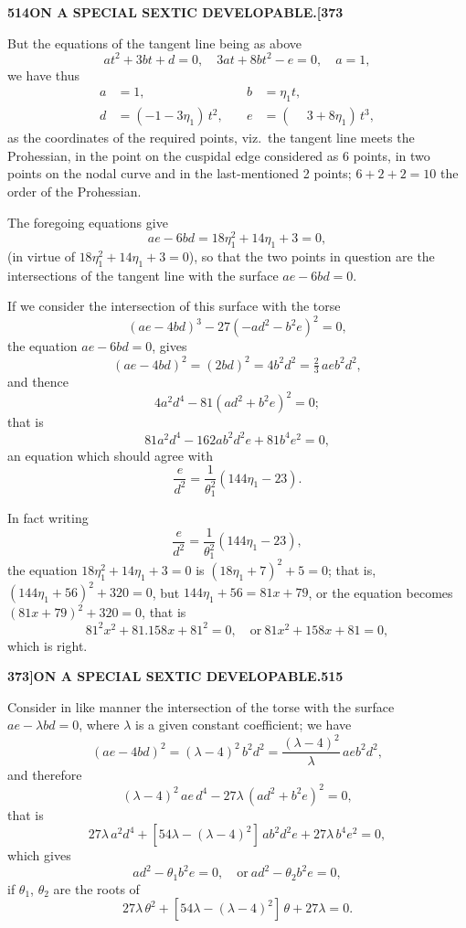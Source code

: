 \documentclass[11pt,a4paper]{article}
\begin{document}
\newpage
\noindent\textbf{514\hspace{1em}ON A SPECIAL SEXTIC DEVELOPABLE.\hfill[373}

\vspace{12pt}

\noindent
But the equations of the tangent line being as above
\[
at^{2} + 3bt + d = 0,\quad 3at + 8bt^{2} - e = 0,\quad a = 1,
\]
we have thus
\begin{align*}
a &= 1, & b &= \eta_{1}t,\\
d &= (-1 - 3\eta_{1})\,t^{2},\quad & e &= (\phantom{-}3 + 8\eta_{1})\,t^{3},
\end{align*}
as the coordinates of the required points, viz.~the tangent line meets the Prohessian, in the point on the cuspidal edge considered as 6 points, in two points on the nodal curve and in the last-mentioned 2 points; $6 + 2 + 2 = 10$ the order of the Prohessian.

The foregoing equations give
\[
ae - 6bd = 18\eta_{1}^{2} + 14\eta_{1} + 3 = 0,
\]
(in virtue of $18\eta_{1}^{2} + 14\eta_{1} + 3 = 0$), so that the two points in question are the intersections of the tangent line with the surface $ae - 6bd = 0$.

If we consider the intersection of this surface with the torse
\[
(ae - 4bd)^{3} - 27(-ad^{2} - b^{2}e)^{2} = 0,
\]
the equation $ae - 6bd = 0$, gives
\[
(ae - 4bd)^{2} = (2bd)^{2} = 4b^{2}d^{2} = \tfrac{2}{3}\,aeb^{2}d^{2},
\]
and thence
\[
4a^{2}d^{4} - 81(ad^{2} + b^{2}e)^{2} = 0;
\]
that is
\[
81a^{2}d^{4} - 162ab^{2}d^{2}e + 81b^{4}e^{2} = 0,
\]
an equation which should agree with
\[
\frac{e}{d^{2}} = \frac{1}{\theta_{1}^{2}}(144\eta_{1} - 23).
\]

In fact writing
\[
\frac{e}{d^{2}} = \frac{1}{\theta_{1}^{2}}(144\eta_{1} - 23),
\]
the equation $18\eta_{1}^{2} + 14\eta_{1} + 3 = 0$ is $(18\eta_{1} + 7)^{2} + 5 = 0$; that is, $(144\eta_{1} + 56)^{2} + 320 = 0$, but $144\eta_{1} + 56 = 81x + 79$, or the equation becomes $(81x + 79)^{2} + 320 = 0$, that is
\[
81^{2}x^{2} + 81.158x + 81^{2} = 0,\quad \text{or}\ 81x^{2} + 158x + 81 = 0,
\]
which is right.

\newpage
\begin{flushright}
\textbf{373]\hspace{1em}ON A SPECIAL SEXTIC DEVELOPABLE.\hfill515}
\end{flushright}

\vspace{12pt}

\noindent
Consider in like manner the intersection of the torse with the surface $ae - \lambda bd = 0$, where $\lambda$ is a given constant coefficient; we have
\[
(ae - 4bd)^{2} = (\lambda - 4)^{2}\,b^{2}d^{2} = \frac{(\lambda - 4)^{2}}{\lambda}\,aeb^{2}d^{2},
\]
and therefore
\[
(\lambda - 4)^{2}\,ae\,d^{4} - 27\lambda\,(ad^{2} + b^{2}e)^{2} = 0,
\]
that is
\[
27\lambda\,a^{2}d^{4} + [54\lambda - (\lambda - 4)^{2}]\,ab^{2}d^{2}e + 27\lambda\,b^{4}e^{2} = 0,
\]
which gives
\[
ad^{2} - \theta_{1}b^{2}e = 0,\quad \text{or}\ ad^{2} - \theta_{2}b^{2}e = 0,
\]
if $\theta_{1}$, $\theta_{2}$ are the roots of
\[
27\lambda\,\theta^{2} + [54\lambda - (\lambda - 4)^{2}]\,\theta + 27\lambda = 0.
\]
\end{document}
